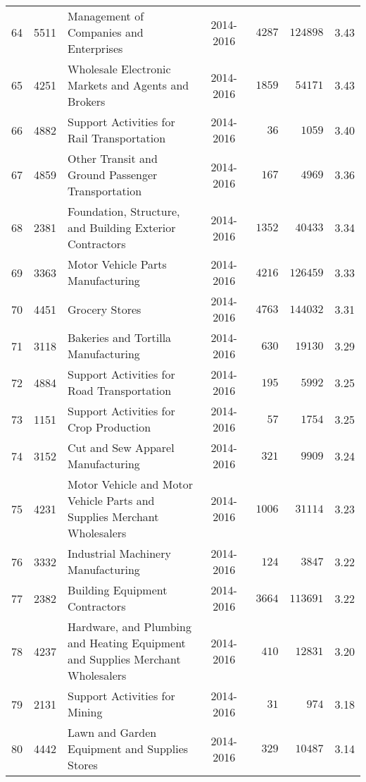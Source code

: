 \documentclass[9pt, oneside]{article}   	%
\begin{document}
\begin{longtable}{lcp{3in}cccc}
64  & 5511 & Management of Companies and Enterprises & 2014-2016 & $\phantom{0}4287$ & $124898$ &  3.43 \\
65  & 4251 & Wholesale Electronic Markets and Agents and Brokers & 2014-2016 & $\phantom{0}1859$ & $\phantom{0}54171$ &  3.43 \\
66  & 4882 & Support Activities for Rail Transportation & 2014-2016 & $\phantom{000}36$ & $\phantom{00}1059$ &  3.40 \\
67  & 4859 & Other Transit and Ground Passenger Transportation & 2014-2016 & $\phantom{00}167$ & $\phantom{00}4969$ &  3.36 \\
68  & 2381 & Foundation, Structure, and Building Exterior Contractors & 2014-2016 & $\phantom{0}1352$ & $\phantom{0}40433$ &  3.34 \\
69  & 3363 & Motor Vehicle Parts Manufacturing & 2014-2016 & $\phantom{0}4216$ & $126459$ &  3.33 \\
70  & 4451 & Grocery Stores & 2014-2016 & $\phantom{0}4763$ & $144032$ &  3.31 \\
71  & 3118 & Bakeries and Tortilla Manufacturing & 2014-2016 & $\phantom{00}630$ & $\phantom{0}19130$ &  3.29 \\
72  & 4884 & Support Activities for Road Transportation & 2014-2016 & $\phantom{00}195$ & $\phantom{00}5992$ &  3.25 \\
73  & 1151 & Support Activities for Crop Production & 2014-2016 & $\phantom{000}57$ & $\phantom{00}1754$ &  3.25 \\
74  & 3152 & Cut and Sew Apparel Manufacturing & 2014-2016 & $\phantom{00}321$ & $\phantom{00}9909$ &  3.24 \\
75  & 4231 & Motor Vehicle and Motor Vehicle Parts and Supplies Merchant Wholesalers & 2014-2016 & $\phantom{0}1006$ & $\phantom{0}31114$ &  3.23 \\
76  & 3332 & Industrial Machinery Manufacturing & 2014-2016 & $\phantom{00}124$ & $\phantom{00}3847$ &  3.22 \\
77  & 2382 & Building Equipment Contractors & 2014-2016 & $\phantom{0}3664$ & $113691$ &  3.22 \\
78  & 4237 & Hardware, and Plumbing and Heating Equipment and Supplies Merchant Wholesalers & 2014-2016 & $\phantom{00}410$ & $\phantom{0}12831$ &  3.20 \\
79  & 2131 & Support Activities for Mining & 2014-2016 & $\phantom{000}31$ & $\phantom{000}974$ &  3.18 \\
80  & 4442 & Lawn and Garden Equipment and Supplies Stores & 2014-2016 & $\phantom{00}329$ & $\phantom{0}10487$ &  3.14 \\

\end{longtable}
\end{document}
